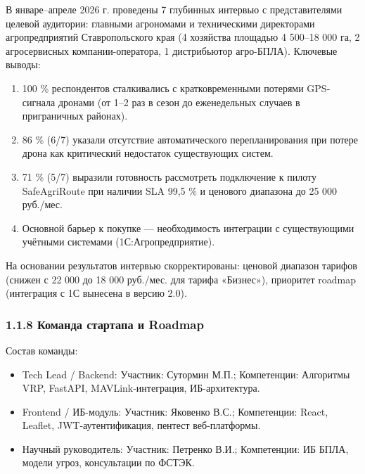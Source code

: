 \documentclass[14pt,a4paper]{extarticle}
\providecommand{\tightlist}{%
  \setlength{\itemsep}{0pt}\setlength{\parskip}{0pt}}
\begin{document}
В январе--апреле 2026 г. проведены 7 глубинных интервью с представителями целевой аудитории: главными агрономами и техническими директорами агропредприятий Ставропольского края (4 хозяйства площадью 4 500--18 000 га, 2 агросервисных компании-оператора, 1 дистрибьютор агро-БПЛА). Ключевые выводы:

\begin{enumerate}
\def\labelenumi{\arabic{enumi}.}
\tightlist
\item
  100 \% респондентов сталкивались с кратковременными потерями GPS-сигнала дронами (от 1--2 раз в сезон до еженедельных случаев в приграничных районах).
\item
  86 \% (6/7) указали отсутствие автоматического перепланирования при потере дрона как критический недостаток существующих систем.
\item
  71 \% (5/7) выразили готовность рассмотреть подключение к пилоту SafeAgriRoute при наличии SLA 99,5 \% и ценового диапазона до 25 000 руб./мес.
\item
  Основной барьер к покупке --- необходимость интеграции с существующими учётными системами (1С:Агропредприятие).
\end{enumerate}

На основании результатов интервью скорректированы: ценовой диапазон тарифов (снижен с 22 000 до 18 000 руб./мес. для тарифа «Бизнес»), приоритет roadmap (интеграция с 1С вынесена в версию 2.0).

\hypertarget{ux43aux43eux43cux430ux43dux434ux430-ux441ux442ux430ux440ux442ux430ux43fux430-ux438-roadmap}{%
\subsubsection{1.1.8 Команда стартапа и Roadmap}\label{ux43aux43eux43cux430ux43dux434ux430-ux441ux442ux430ux440ux442ux430ux43fux430-ux438-roadmap}}

Состав команды:

\begin{itemize}
\item Tech Lead / Backend: Участник: Сутормин М.П.; Компетенции: Алгоритмы VRP, FastAPI, MAVLink-интеграция, ИБ-архитектура.
\item Frontend / ИБ-модуль: Участник: Яковенко В.С.; Компетенции: React, Leaflet, JWT-аутентификация, пентест веб-платформы.
\item Научный руководитель: Участник: Петренко В.И.; Компетенции: ИБ БПЛА, модели угроз, консультации по ФСТЭК.
\end{itemize}
\end{document}
